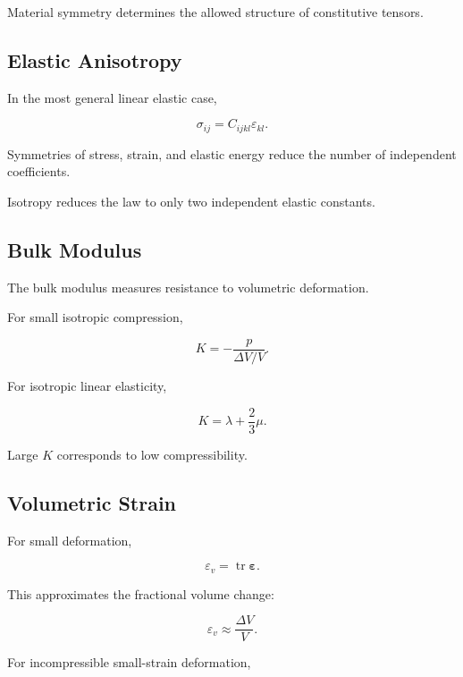 Material symmetry determines the allowed structure of constitutive tensors.

\subsection{Elastic Anisotropy}
\label{subsec:elastic-anisotropy}

In the most general linear elastic case,

\[
\boxed{
\sigma_{ij}
=
C_{ijkl}\varepsilon_{kl}.
}
\]

Symmetries of stress, strain, and elastic energy reduce the number of
independent coefficients.

Isotropy reduces the law to only two independent elastic constants.

\subsection{Bulk Modulus}
\label{subsec:bulk-modulus}

The bulk modulus measures resistance to volumetric deformation.

For small isotropic compression,

\[
\boxed{
K
=
-\frac{p}
{\Delta V/V}.
}
\]

For isotropic linear elasticity,

\[
\boxed{
K
=
\lambda+\frac{2}{3}\mu.
}
\]

Large \(K\) corresponds to low compressibility.

\subsection{Volumetric Strain}
\label{subsec:volumetric-strain}

For small deformation,

\[
\boxed{
\varepsilon_v
=
\operatorname{tr}
\boldsymbol{\varepsilon}.
}
\]

This approximates the fractional volume change:

\[
\boxed{
\varepsilon_v
\approx
\frac{\Delta V}{V}.
}
\]

For incompressible small-strain deformation,

